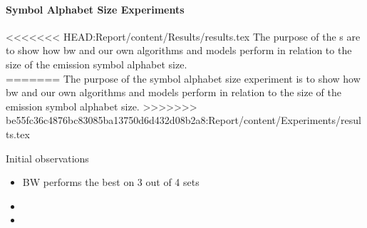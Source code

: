 \paragraph{Symbol Alphabet Size Experiments}
<<<<<<< HEAD:Report/content/Results/results.tex
The purpose of the s are to show how \gls{bw} and our own algorithms and models perform in relation to the size of the emission symbol alphabet size.\\
=======
The purpose of the symbol alphabet size experiment is to show how \gls{bw} and our own algorithms and models perform in relation to the size of the emission symbol alphabet size.
>>>>>>> be55fc36c4876bc83085ba13750d6d432d08b2a8:Report/content/Experiments/results.tex

	
	
Initial observations
\begin{itemize}
\item BW performs the best on 3 out of 4 sets
\item 
\item 
\end{itemize}	
	
